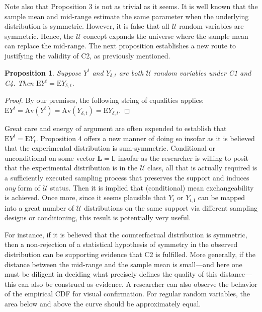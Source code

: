 \documentclass[12pt]{amsart}
\theoremstyle{plain}%
\newtheorem{proposition}{Proposition}
\theoremstyle{definition}
\theoremstyle{remark}
\numberwithin{equation}{section}
\begin{document}
Note also that Proposition 3 is not as trivial as it seems. It is well known that the sample mean and mid-range estimate the same parameter when the underlying distribution is symmetric. However, it is false that all $\mathcal{U}$ random variables are symmetric. Hence, the $\mathcal{U}$ concept expands the universe where the sample mean can replace the mid-range. The next proposition establishes a new route to justifying the validity of C2, as previously mentioned.
\begin{proposition}
Suppose $Y^t$ and $Y_{\delta, t}$ are both $\mathcal{U}$ random variables under C1 and C4. Then $\text{E}Y^t = \text{E}Y_{\delta, t}$.
\end{proposition}
\begin{proof}
By our premises, the following string of equalities applies: $\text{E}Y^t = \text{Av}(Y^t) = \text{Av}(Y_{\delta, t}) = \text{E}Y_{\delta, t}$.
\end{proof}
Great care and energy of argument are often expended to establish that $\text{E}Y^{t} = \text{E}Y_{t}$. Proposition 4 offers a new manner of doing so insofar as it is believed that the experimental distribution is sum-symmetric. Conditional or unconditional on some vector $\mathbf{L=l}$, insofar as the researcher is willing to posit that the experimental distribution is in the $\mathcal{U}$ class, all that is actually required is a sufficiently executed sampling process that preserves the support and induces \textit{any} form of $\mathcal{U}$ status. Then it is implied that (conditional) mean exchangeability is achieved. Once more, since it seems plausible that $Y_{t}$ or $Y_{t, \mathbf{l}}$ can be mapped into a great number of $\mathcal{U}$ distributions on the same support via different sampling designs or conditioning, this result is potentially very useful.

For instance, if it is believed that the counterfactual distribution is symmetric, then a non-rejection of a statistical hypothesis of symmetry in the observed distribution can be supporting evidence that C2 is fulfilled. More generally, if the distance between the mid-range and the sample mean is small---and here one must be diligent in deciding what precisely defines the quality of this distance---this can also be construed as evidence. A researcher can also observe the behavior of the empirical CDF for visual confirmation. For regular random variables, the area below and above the curve should be approximately equal.
\newline
\end{document}
